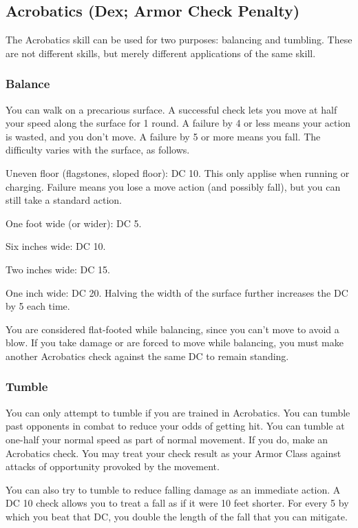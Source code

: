 \subsection{Acrobatics (Dex; Armor Check Penalty)}
The Acrobatics skill can be used for two purposes: balancing and tumbling. These are not different skills, but merely different applications of the same skill.
\subsubsection{Balance}
 You can walk on a precarious surface. A successful check lets you move at half your speed along the surface for 1 round. A failure by 4 or less means your action is wasted, and you don't move. A failure by 5 or more means you fall. The difficulty varies with the surface, as follows.

\begin{itemize*}
  \item Uneven floor (flagstones, sloped floor): DC 10. This only applise when running or charging. Failure means you lose a move action (and possibly fall), but you can still take a standard action.
  \item One foot wide (or wider): DC 5. 
  \item Six inches wide: DC 10.
  \item Two inches wide: DC 15.
  \item One inch wide: DC 20. Halving the width of the surface further increases the DC by 5 each time.
\end{itemize*}

 You are considered flat-footed while balancing, since you can't move to avoid a blow. If you take damage or are forced to move while balancing, you must make another Acrobatics check against the same DC to remain standing.

\subsubsection{Tumble}
You can only attempt to tumble if you are trained in Acrobatics.
 You can tumble past opponents in combat to reduce your odds of getting hit. You can tumble at one-half your normal speed as part of normal movement. If you do, make an Acrobatics check. You may treat your check result as your Armor Class against attacks of opportunity provoked by the movement.

You can also try to tumble to reduce falling damage as an immediate action. A DC 10 check allows you to treat a fall as if it were 10 feet shorter. For every 5 by which you beat that DC, you double the length of the fall that you can mitigate.

